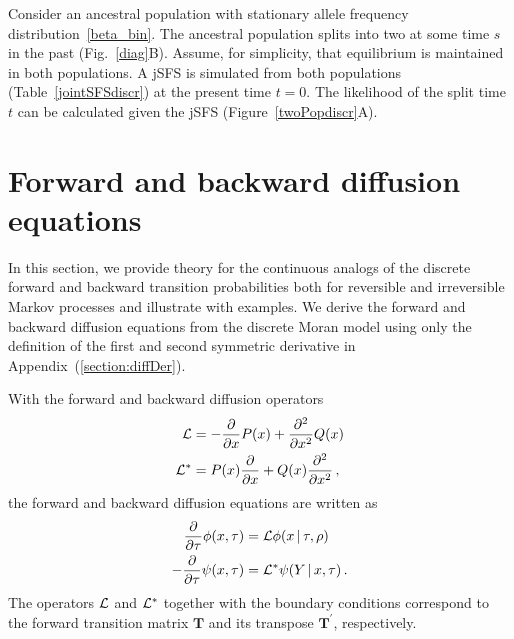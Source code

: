 \documentclass[preprint]{elsarticle}
\newcommand\given{{\,|\,}}
\newcommand\y{\ensuremath{Y}}
\begin{document}
Consider an ancestral population with stationary allele frequency distribution~\eqref{beta_bin}. The ancestral population splits into two at some time $s$ in the past (Fig.~\ref{diag}B). Assume, for simplicity, that equilibrium is maintained in both populations. A jSFS is simulated from both populations (Table~\ref{jointSFSdiscr}) at the present time $t=0$. The likelihood of the split time $t$ can be calculated given the jSFS (Figure~\ref{twoPopdiscr}A).



\section{Forward and backward diffusion equations}\label{forwBackDiff}

In this section, we provide theory for the continuous analogs of the discrete forward and backward transition probabilities both for reversible and irreversible Markov processes and illustrate with examples. We derive the forward and backward diffusion equations from the discrete Moran model using only the definition of the first and second symmetric derivative in Appendix~(\ref{section:diffDer}).

With the forward and backward diffusion operators 
\begin{equation}\label{eq:forw_backw_operator}
 \begin{split}
     {\cal L}&=-\frac{\partial}{\partial x}P(x)+ \frac{\partial^2}{\partial x^2}Q(x)\\
     {\cal L}^{*}&=P(x)\frac{\partial}{\partial x} +Q(x)\frac{\partial^2}{\partial x^2}\,,
 \end{split}
\end{equation}
the forward and backward diffusion equations are written as
\begin{equation}\label{eq:forw_backw_diff}
\begin{split}
\frac{\partial}{\partial \tau}\phi(x,\tau)&={\cal L} \phi(x\given \tau,\rho)\\
-\frac{\partial}{\partial \tau}\psi(x,\tau)&={\cal L}^{*} \psi(\y\given x, \tau)\,.
\end{split}
\end{equation}
The operators ${\cal L}$ and ${\cal L}^{*}$ together with the boundary conditions correspond to the forward transition matrix $\mathbf{T}$ and its transpose $\mathbf{T}^{'}$, respectively. %
\end{document}
